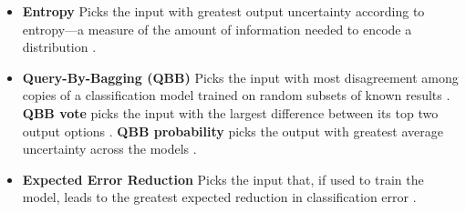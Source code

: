 \documentclass{sig-alternate}
\begin{document}
\begin{itemize}
%
\item \textbf{Entropy} Picks the input with greatest output uncertainty according to entropy---a measure of the amount of information needed to encode a distribution \cite{settles2012:al-book}.
%
\item \textbf{Query-By-Bagging (QBB)} Picks the input with most disagreement among copies of a classification model trained on random subsets of known results \cite{settles2012:al-book}.
\textbf{QBB vote} picks the input with the largest difference between its top two output options \cite{settles2012:al-book}.
\textbf{QBB probability} picks the output with greatest average uncertainty across the models \cite{abe1998:qbb}.
%
\item \textbf{Expected Error Reduction} Picks the input that, if used to train the model, leads to the greatest expected reduction in classification error \cite{settles2012:al-book}.

\end{itemize}
\end{document}
